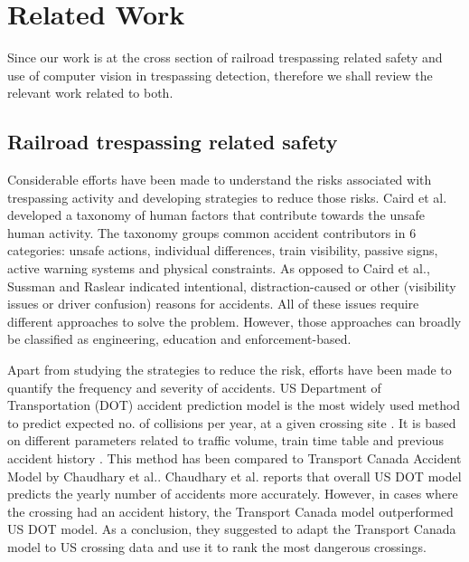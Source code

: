 \section{Related Work}
\label{sec:related-work}
Since our work is at the cross section of railroad trespassing related safety and use of computer vision in trespassing detection, therefore we shall review the relevant work related to both. 

\subsection{Railroad trespassing related safety} Considerable efforts have been made to understand the risks associated with trespassing activity and developing strategies to reduce those risks. Caird et al.\cite{caird2002human} developed a taxonomy of human factors that contribute towards the unsafe human activity.  The taxonomy groups  common accident contributors in 6 categories: unsafe actions, individual differences, train visibility, passive signs, active warning systems and physical constraints. As opposed to Caird et al.\cite{caird2002human}, Sussman and Raslear\cite{sussman2007railroad} indicated intentional, distraction-caused or other (visibility issues or driver confusion) reasons for accidents. All of these issues require different approaches to solve the problem. However, those approaches can broadly be classified as engineering, education and enforcement-based.

Apart from studying the strategies to reduce the risk, efforts have been made to quantify the frequency and severity of accidents. US Department of Transportation (DOT) accident prediction model is the most widely used method to predict expected no. of collisions per year, at a given crossing site \cite{austin2002alternative,tustin1986railroad}. It is based on different parameters related to traffic volume, train time table and previous accident history \cite{chadwick2014highway}. This method has been compared to Transport Canada Accident Model \cite{saccomanno2003identifying} by Chaudhary et al.\cite{chaudhary2011railroad}. Chaudhary et al. reports that overall US DOT model predicts the yearly number of accidents more accurately. However, in cases where the crossing had an accident history, the Transport Canada model outperformed US DOT model. As a conclusion, they suggested to adapt the Transport Canada model to US crossing data and use it to rank the most dangerous crossings.

